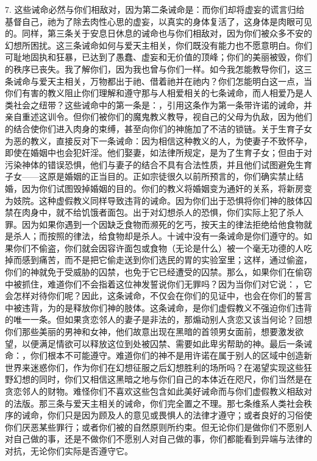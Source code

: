 7. 这些诫命必然与你们相敌对，因为第二条诫命是：而你们却将虚妄的谎言归给基督自己，祂为了除去肉性心思的虚妄，以真实的身体复活了，这身体是肉眼可见的。同样，第三条关于安息日休息的诫命也与你们相敌对，因为你们被众多不安的幻想所困扰。这三条诫命如何与爱天主相关，你们既没有能力也不愿意明白。你们可耻地固执和狂暴，已达到了愚蠢、虚妄和无价值的顶峰；你们的美丽被毁，你们的秩序已丧失。我了解你们，因为我也曾与你们一样。如今我怎能教导你们，这三条诫命与爱天主相关，万物都出于祂、借着祂并在祂内？你们怎能明白这一点，当你们有害的教义阻止你们理解和遵守那与人相爱相关的七条诫命，而人相爱乃是人类社会之纽带？这些诫命中的第一条是：，引用这条作为第一条带许诺的诫命，并亲自重述这训令。但你们被你们的魔鬼教义教导，视自己的父母为仇敌，因为他们的结合使你们进入肉身的束缚，甚至向你们的神施加了不洁的锁链。关于生育子女为恶的教义，直接反对下一条诫命：因为相信这种教义的人，为使妻子不致怀孕，即使在婚姻中也会犯奸淫。他们娶妻，如法律所规定，是为了生育子女；但由于对污染神体的错误恐惧，他们与妻子的结合不具有合法性质，并且他们试图避免生育子女——这原是婚姻的正当目的。正如宗徒很久以前所预言的，你们确实禁止结婚，因为你们试图毁掉婚姻的目的。你们的教义将婚姻变为通奸的关系，将新房变为妓院。这种虚假教义同样导致违背的诫命。因为你们出于恐惧将你们神的肢体囚禁在肉身中，就不给饥饿者面包。出于对幻想杀人的恐惧，你们实际上犯了杀人罪。因为如果你遇到一个因缺乏食物而濒死的乞丐，按天主的律法拒绝给他食物就是杀人；而按照的律法，给食物却是杀人。十诫中没有一条诫命是你们遵守的。如果你们不偷盗，你们就会因容许面包或食物（无论是什么）被一个毫无功德的人吃掉而感到痛苦，而不是把它偷走送到你们选民的胃的实验室里；这样，通过偷盗，你们的神就免于受威胁的囚禁，也免于它已经遭受的囚禁。那么，如果你们在偷窃中被抓住，难道你们不会指着这位神发誓说你们无罪吗？因为当你们对它说：，它会怎样对待你们呢？因此，这条诫命，不仅会在你们的见证中，也会在你们的誓言中被违背，为的是释放你们神的肢体。这条诫命，是你们虚假教义不强迫你们违背的唯一一条。但如果贪恋邻人的妻子是非法的，那煽动别人贪恋又该当何论？回想你们那些美丽的男神和女神，他们故意出现在黑暗的首领男女面前，想要激发欲望，以便满足情欲可以释放这位到处被囚禁、需要如此卑劣帮助的神。最后一条诫命：，你们根本不可能遵守。难道你们的神不是用许诺在属于别人的区域中创造新世界来迷惑你们，作为你们在幻想征服之后幻想胜利的场所吗？在渴望实现这些狂野幻想的同时，你们又相信这黑暗之地与你们自己的本体近在咫尺，你们当然是在贪恋邻人的财物。难怪你们不喜欢这些包含如此美好诫命而与你们虚假教义相敌对的法版。那三条与爱天主相关的诫命，你们完全置之不理。那七条维系人类社会秩序的诫命，你们只是因为顾及人的意见或畏惧人的法律才遵守；或者良好的习俗使你们厌恶某些罪行；或者你们被的自然原则所约束。但无论你们是做你们不愿别人对自己做的事，还是不做你们不愿别人对自己做的事，你们都能看到异端与法律的对抗，无论你们实际是否遵守它。\par

